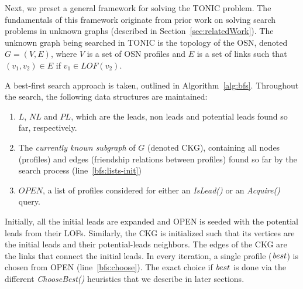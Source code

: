 \documentclass[journal]{IEEEtran}
\newcommand{\islead}[1]{{\em IsLead(#1)}}
\newcommand{\acquire}[1]{{\em Acquire(#1)}}
\newcommand{\best}{{\textit best}}
\begin{document}

Next, we preset a general framework for solving the TONIC problem. The fundamentals of this framework originate from prior work on solving search problems in unknown graphs (described in Section~\ref{sec:relatedWork}). The unknown graph being searched in TONIC is the topology of the OSN, denoted $G=(V,E)$, where $V$ is a set of OSN profiles and $E$ is a set of links such that \((v_1,v_2)\in E\) if $v_1\in LOF(v_2)$. 

A best-first search approach is taken, outlined in Algorithm~\ref{alg:bfs}. Throughout the search, the following data structures are maintained:
\begin{enumerate}
	\item $L$, $NL$ and $PL$, which are the leads, non leads and potential leads found so far, respectively.
	\item The {\em currently known subgraph} of $G$ (denoted CKG), containing all nodes (profiles) and edges (friendship relations between profiles) found so far by the search process (line~\ref{bfs:lists-init})
	\item $OPEN$, a list of profiles considered for either an \islead{} or an \acquire{} query. 
\end{enumerate}

% 

Initially, all the initial leads are expanded and OPEN is seeded with the potential leads from their LOFs. Similarly, the CKG is initialized such that its vertices are the initial leads and their potential-leads neighbors. The edges of the CKG are the links that connect the initial leads. In every iteration, a single profile ($\best$) is chosen from OPEN (line~\ref{bfs:choose}). The exact choice if $\best$ is done via the different {\em ChooseBest()} heuristics that we describe in later sections.
\end{document}

